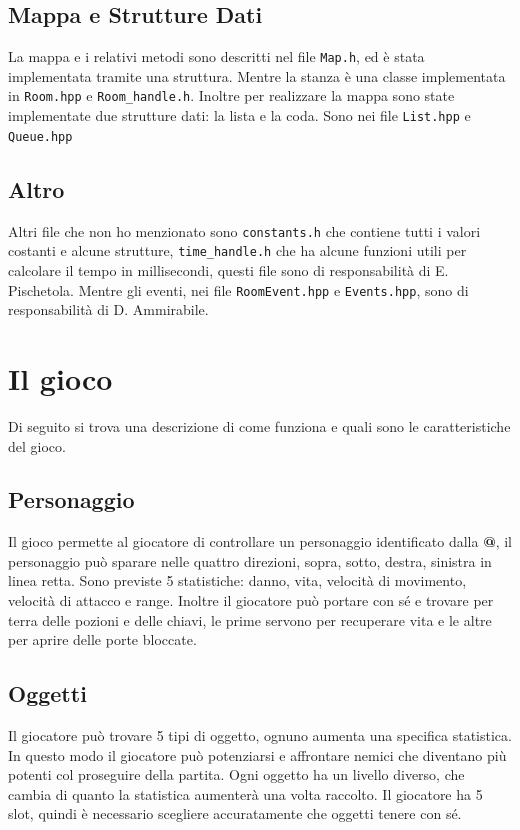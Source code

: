 \documentclass{article}
\begin{document}
\subsection{Mappa e Strutture Dati}
La mappa e i relativi metodi sono descritti nel file \texttt{Map.h}, ed è stata implementata tramite una struttura. Mentre la stanza è una classe implementata in \texttt{Room.hpp} e \texttt{Room\_handle.h}. Inoltre per realizzare la mappa sono state implementate due strutture dati: la lista e la coda. Sono nei file \texttt{List.hpp} e \texttt{Queue.hpp}

\subsection{Altro}
Altri file che non ho menzionato sono \texttt{constants.h} che contiene tutti i valori costanti e alcune strutture, \texttt{time\_handle.h} che ha alcune funzioni utili per calcolare il tempo in millisecondi, questi file sono di responsabilità di E. Pischetola. Mentre gli eventi, nei file \texttt{RoomEvent.hpp} e \texttt{Events.hpp}, sono di responsabilità di D. Ammirabile.

\section{Il gioco}
Di seguito si trova una descrizione di come funziona e quali sono le caratteristiche del gioco.

\subsection{Personaggio}
Il gioco permette al giocatore di controllare un personaggio identificato dalla \textbf{@}, il personaggio può sparare nelle quattro direzioni, sopra, sotto, destra, sinistra in linea retta.
Sono previste 5 statistiche: danno, vita, velocità di movimento, velocità di attacco e range. 
Inoltre il giocatore può portare con sé e trovare per terra delle pozioni e delle chiavi, le prime servono per recuperare vita e le altre per aprire delle porte bloccate.

\subsection{Oggetti}
Il giocatore può trovare 5 tipi di oggetto, ognuno aumenta una specifica statistica. In questo modo il giocatore può potenziarsi e affrontare nemici che diventano più potenti col proseguire della partita. Ogni oggetto ha un livello diverso, che cambia di quanto la statistica aumenterà una volta raccolto. Il giocatore ha 5 slot, quindi è necessario scegliere accuratamente che oggetti tenere con sé.
\end{document}
